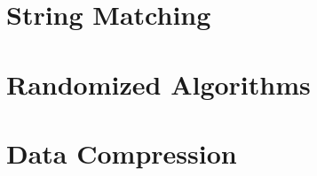 \documentclass[11pt, oneside]{book}
\begin{document}
\maketitlepage
\tableofcontents

\chapter{String Matching}





% 
% 
% 

\chapter{Randomized Algorithms}
% 

\chapter{Data Compression}
% 
\end{document}

